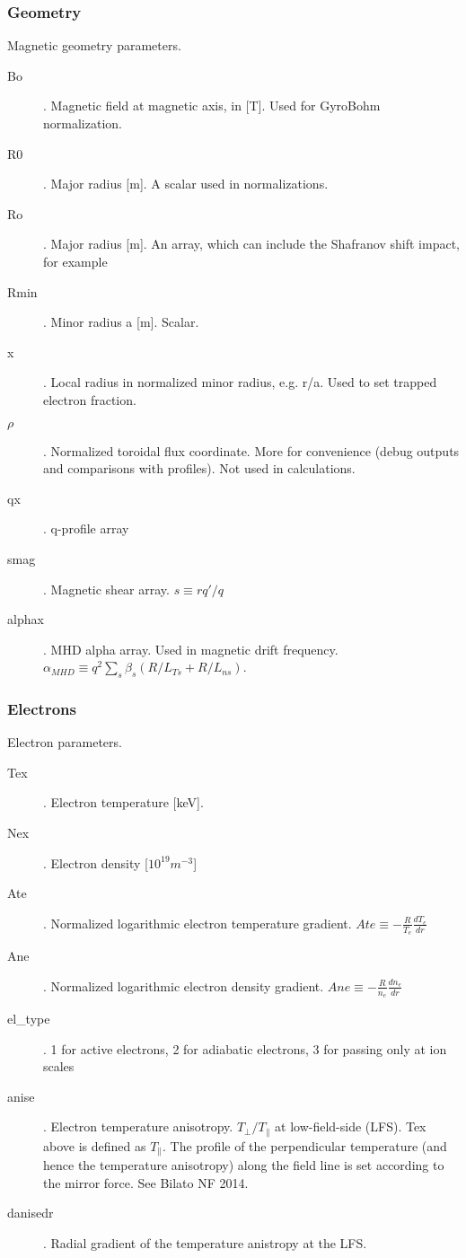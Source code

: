 \documentclass{article}
\begin{document}
\subsubsection{Geometry}
Magnetic geometry parameters.
\begin{description}
\item[Bo]. Magnetic field at magnetic axis, in [T]. Used for GyroBohm normalization.
\item[R0]. Major radius [m]. A scalar used in normalizations.
\item[Ro]. Major radius [m]. An array, which can include the Shafranov shift impact, for example
\item[Rmin]. Minor radius a [m]. Scalar.
\item[x]. Local radius in normalized minor radius, e.g. r/a. Used to set trapped electron fraction.
\item[$\rho$]. Normalized toroidal flux coordinate. More for convenience (debug outputs and comparisons with profiles). Not used in calculations.
\item[qx]. q-profile array
\item[smag]. Magnetic shear array. $s{\equiv}rq'/q$ 
\item[alphax]. MHD alpha array. Used in magnetic drift frequency. $\alpha_{MHD}{\equiv}q^2\sum_s\beta_s(R/L_{Ts}+R/L_{ns})$.
\end{description}
\subsubsection{Electrons}
Electron parameters.
\begin{description}
\item[Tex]. Electron temperature [keV].
\item[Nex]. Electron density [$10^{19} m^{-3}$]
\item[Ate]. Normalized logarithmic electron temperature gradient. $Ate{\equiv}-\frac{R}{T_e}\frac{dT_e}{dr}$
\item[Ane]. Normalized logarithmic electron density gradient. $Ane{\equiv}-\frac{R}{n_e}\frac{dn_e}{dr}$
\item[el\_type]. 1 for active electrons, 2 for adiabatic electrons, 3 for passing only at ion scales
\item[anise]. Electron temperature anisotropy. $T_\perp/T_\parallel$ at low-field-side (LFS). Tex above is defined as $T_\parallel$. The profile of the perpendicular temperature (and hence the temperature anisotropy) along the field line is set according to the mirror force. See Bilato NF 2014.
\item[danisedr]. Radial gradient of the temperature anistropy at the LFS.
\end{description}
\end{document}
